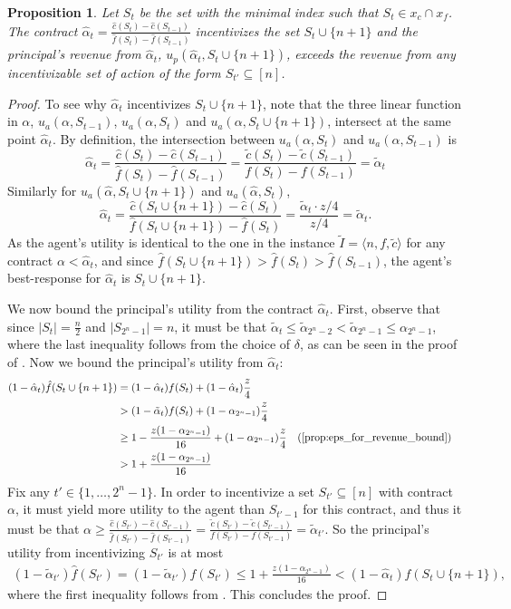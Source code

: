 \documentclass[11pt]{article}
\newtheorem{proposition}{Proposition}
\newcommand{\inst}[3]{\langle #1, #2, #3 \rangle}
\newcommand{\tc}{\tilde{c}}
\newcommand{\talpha}{\tilde{\alpha}}
\newcommand{\hf}{\hat{f}}
\newcommand{\hc}{\hat{c}}
\newcommand{\halpha}{\hat{\alpha}}
\newcommand{\tI}{\tilde{I}}
\newcommand{\InstTildeI}{\tI = \inst{n}{f}{\tc}}
\begin{document}
\begin{proposition}\label{prop:n+1_is_optimal}
    Let $S_t$ be the set with the minimal index such that $S_t \in x_c \cap x_f$. 
    The contract $\halpha_t = \frac{\hc(S_t)-\hc(S_{t-1})}{\hf(S_t)-\hf(S_{t-1})}$ incentivizes the set $S_t \cup \{n+1\}$ and
    the principal's revenue from $\halpha_t$, $u_p(\halpha_t,S_t\cup\{n+1\})$, exceeds the revenue from any incentivizable set of action of the form $S_{t'} \subseteq [n]$.
\end{proposition}
\begin{proof}
To see why $\halpha_t$ incentivizes $S_t \cup \{n+1\}$, note that the three linear function in $\alpha$, $u_a(\alpha, S_{t-1})$, $u_a(\alpha, S_t)$ and $u_a(\alpha, S_t \cup \{n+1\})$, intersect at the same point $\halpha_t$.
By definition, the intersection between $u_a(\alpha, S_t)$ and $u_a(\alpha, S_{t-1})$ is
$$
\halpha_t = 
\frac{\hc(S_t) - \hc(S_{t-1})}{\hf(S_t) - \hf(S_{t-1})}
= \frac{\tc(S_t) - \tc(S_{t-1})}{f(S_t) - f(S_{t-1})}
= \talpha_t
$$
Similarly for $u_a(\halpha, S_t \cup \{n+1\})$ and $u_a(\halpha, S_t)$,
$$
\halpha_t = \frac{\hc(S_t \cup \{n+1\}) - \hc(S_t)}{\hf(S_t  \cup \{n+1\}) - \hf(S_t)} = \frac{\talpha_t \cdot z/4}{z/4} = \talpha_t.
$$
As the agent's utility is identical to the one in the instance $\InstTildeI$ for any contract $\alpha < \halpha_t$, and
since $\hf(S_t \cup \{n+1\}) > \hf(S_t) > \hf(S_{t-1})$, the agent's best-response for $\halpha_t$ is $S_t \cup \{n+1\}$.

We now bound the principal's utility from the contract $\halpha_t$.
First, observe that since $|S_t|=\frac{n}{2}$ and $|S_{2^n-1}|=n$, it must be that $\talpha_t \le \talpha_{2^n-2} < \talpha_{2^n-1} \le \alpha_{2^n-1}$, where the last inequality follows from the choice of $\delta$, as can be seen in the proof of .
Now we bound the principal's utility from $\halpha_t$:
\begin{align*}
    (1-\halpha_t)\hf(S_t \cup \{n+1\}) 
    &=
    (1-\halpha_t)f(S_t) + (1-\halpha_t)\frac{z}{4} \\
    &>
    (1-\talpha_t)f(S_t) + (1-\alpha_{2^n-1})\frac{z}{4} \\
    &\ge
    1 - \frac{z(1-\alpha_{2^n-1})}{16} + (1-\alpha_{2^n-1})\frac{z}{4} && (\Cref{prop:eps_for_revenue_bound})\\
    &>
    1 + \frac{z(1-\alpha_{2^n-1})}{16}
\end{align*}
Fix any $t' \in \{1,\dots,2^n-1\}$. In order to incentivize a set $S_{t'} \subseteq [n]$ with contract $\alpha$, it must yield more utility to the agent than $S_{t'-1}$ for this contract, and thus it must be that
$\alpha \ge 
\frac{\hc(S_{t'})-\hc(S_{t'-1})}{\hf(S_{t'})-\hf(S_{t'-1})}
=
\frac{\tc(S_{t'})-\tc(S_{t'-1})}{f(S_{t'})-f(S_{t'-1})} = \talpha_{t'}$.
So the principal's utility from incentivizing $S_{t'}$ is at most
\begin{align*}
    (1-\talpha_{t'})\hf(S_{t'}) = 
    (1-\talpha_{t'})f(S_{t'}) \le 1 + \frac{z(1-\alpha_{2^n-1})}{16} < (1-\halpha_t)f(S_t \cup \{n+1\}),
\end{align*}
where the first inequality follows from . This concludes the proof.
\end{proof}
\end{document}
